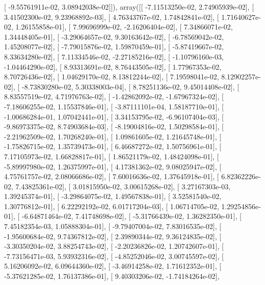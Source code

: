 \documentclass{article}
\begin{document}
       [ -9.55761911e-02,   3.08942038e-02]]), array([[ -7.11513250e-02,   2.74905939e-02],
       [  3.41502300e-02,   9.23968892e-03],
       [  4.76343767e-02,   1.74842841e-02],
       [  1.71640627e-02,   1.26155858e-01],
       [  7.99696999e-02,  -2.16206404e-02],
       [  7.34866071e-02,   1.34448405e-01],
       [ -3.29064657e-02,   9.30163642e-02],
       [ -6.78569042e-02,   1.45208077e-02],
       [ -7.79015876e-02,   1.59870459e-01],
       [ -5.87419667e-02,   8.33634280e-02],
       [  7.11334546e-02,  -2.27185216e-02],
       [ -1.10796160e-03,  -1.04464290e-02],
       [  8.93313691e-02,   8.76443505e-02],
       [  1.77967353e-02,   8.70726436e-02],
       [  1.04629170e-02,   8.13812244e-02],
       [  7.19598041e-02,   8.12902257e-02],
       [ -8.73830280e-02,   5.30338003e-04],
       [  8.78251136e-02,   9.45014408e-02],
       [  8.83557519e-02,   4.71976763e-02],
       [ -1.42862092e-02,  -1.67967324e-02],
       [ -7.18606255e-02,   1.15537846e-01],
       [ -3.87111101e-04,   1.58187710e-01],
       [ -1.00686284e-01,   1.07042441e-01],
       [  3.34153795e-02,  -6.96107404e-03],
       [ -9.86973375e-02,   8.74903684e-03],
       [ -8.19004816e-02,   1.50298584e-01],
       [ -2.21962509e-02,   1.70268240e-01],
       [  1.09861605e-02,   1.21645748e-01],
       [ -1.75826715e-02,   1.35739473e-01],
       [  6.46687272e-02,   1.50756961e-01],
       [  7.17105973e-02,   1.66828817e-01],
       [  1.86521179e-02,   1.48424098e-01],
       [ -5.89997980e-02,   1.26375997e-01],
       [  4.17381362e-02,   9.08025947e-02],
       [  4.75761757e-02,   2.08066686e-02],
       [  7.60016636e-02,   1.37645918e-01],
       [  6.82362226e-02,   7.43825361e-02],
       [  3.01815950e-02,   3.00615268e-02],
       [  3.27167303e-03,   1.39245374e-01],
       [ -3.29864075e-02,   1.49567838e-01],
       [  3.52581540e-02,   1.30776812e-01],
       [  6.22292192e-02,   6.01717204e-03],
       [  1.06714705e-02,   1.29254856e-01],
       [ -6.64871464e-02,   7.41748698e-02],
       [ -5.31766439e-02,   1.36282350e-01],
       [  7.45182354e-03,   1.05888304e-01],
       [ -9.79407004e-02,   7.83016535e-02],
       [ -1.95600684e-02,   9.74367812e-02],
       [  2.39890344e-02,   9.36124835e-02],
       [ -3.30350204e-02,   3.88254743e-02],
       [ -2.20236826e-02,   1.20742607e-01],
       [ -7.73156471e-03,   5.93932316e-02],
       [ -4.85252046e-02,   3.00745597e-02],
       [  5.16206092e-02,   6.09644360e-02],
       [ -3.46914258e-02,   1.71612352e-01],
       [ -5.37621285e-02,   1.76137386e-01],
       [  9.40303206e-02,  -1.74184264e-02],
\end{document}
